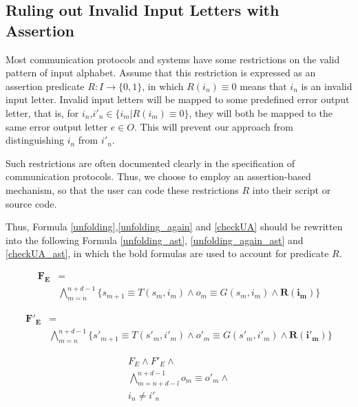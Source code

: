 \documentclass[journal]{IEEEtran}
\begin{document}
\subsection{Ruling out Invalid Input Letters with Assertion}\label{subsec_AST}

Most communication protocols and systems have some restrictions on the valid pattern of input alphabet.
Assume that this restriction is expressed as an assertion predicate $R: I\to \{0,1\}$,
in which $R(i_{n})\equiv 0$ means that $i_n$ is an invalid input letter.
Invalid input letters will be mapped to some predefined error output letter,
that is,
for $i_n$,$i'_n\in \{i_m|R(i_m)\equiv 0\}$,
they will both be mapped to the same error output letter $e\in O$.
This will prevent our approach from distinguishing $i_n$ from $i'_n$.

Such restrictions are often documented clearly in the specification of communication protocols.
Thus,
we choose to employ an assertion-based mechanism,
so that the user can code these restrictions $R$ into their script or source code.

Thus, Formula \ref{unfolding},\ref{unfolding_again} and \ref{checkUA} should be rewritten into the following Formula \ref{unfolding_ast}, \ref{unfolding_again_ast} and \ref{checkUA_ast},
in which the bold formulas are used to account for predicate $R$.

\begin{equation}\label{unfolding_ast}
\begin{split}
\boldsymbol{F_E} &= \\
&
\bigwedge_{m=n}^{n+d-1}
\Big\{
s_{m+1}\equiv T(s_m,i_m) \wedge
o_m\equiv G(s_m,i_m) \wedge
\boldsymbol{R (i_m)}
\Big\}
\end{split}
\end{equation}

\begin{equation}\label{unfolding_again_ast}
\begin{split}
\boldsymbol{F'_E} &= \\
&
\bigwedge_{m=n}^{n+d-1}
\Big\{
s'_{m+1}\equiv T(s'_m,i'_m) \wedge
o'_m\equiv G(s'_m,i'_m) \wedge
\boldsymbol{R (i'_m)}
\Big\}
\end{split}
\end{equation}

\begin{equation}\label{checkUA_ast}
\begin{array}{c}
F_E\wedge F'_E \wedge \\
\bigwedge_{m=n+d-l}^{n+d-1}o_m\equiv o'_m\wedge \\
i_n\ne i'_n
\end{array}
\end{equation}
\end{document}
